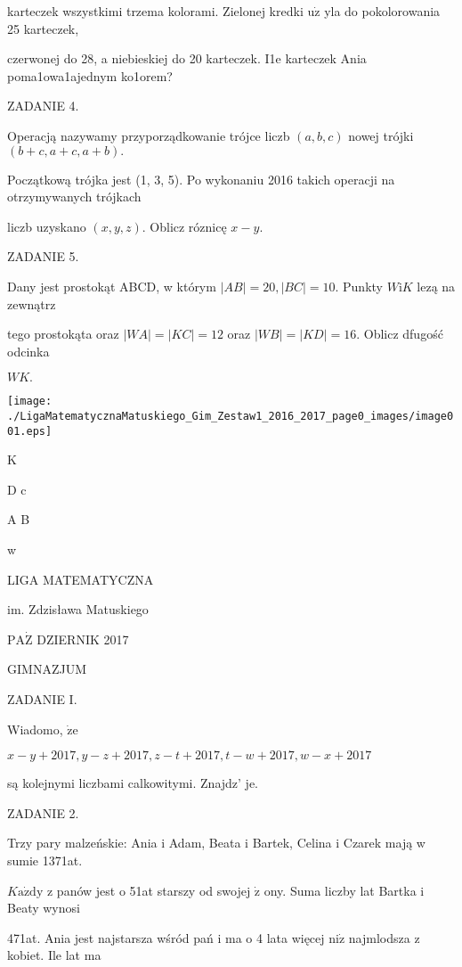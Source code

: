 \documentclass[a4paper,12pt]{article}
\begin{document}
karteczek wszystkimi trzema kolorami. Zielonej kredki $\mathrm{u}\dot{\mathrm{z}}$ yla do pokolorowania 25 karteczek,

czerwonej do 28, a niebieskiej do 20 karteczek. I1e karteczek Ania poma1owa1ajednym ko1orem?

ZADANIE 4.

Operacją nazywamy przyporządkowanie trójce liczb $(a,b,c)$ nowej trójki $(b+c,a+c,a+b).$

Początkową trójka jest (1, 3, 5). Po wykonaniu 2016 takich operacji na otrzymywanych trójkach

liczb uzyskano $(x,y,z)$. Oblicz róznicę $x-y.$

ZADANIE 5.

Dany jest prostokąt ABCD, w którym $|AB|=20, |BC|=10$. Punkty $W\mathrm{i}K$ lezą na zewnątrz

tego prostokąta oraz $|WA| = |KC| = 12$ oraz $|WB| = |KD| = 16$. Oblicz dfugość odcinka

$WK.$
\begin{center}
\texttt{[image: ./LigaMatematycznaMatuskiego\_Gim\_Zestaw1\_2016\_2017\_page0\_images/image001.eps]}
\end{center}
K

D c

A B

w






LIGA MATEMATYCZNA

im. Zdzisława Matuskiego

$\mathrm{P}\mathrm{A}\dot{\mathrm{Z}}$ DZIERNIK 2017

GIMNAZJUM

ZADANIE I.

Wiadomo, $\dot{\mathrm{z}}\mathrm{e}$

$x-y+2017,y-z+2017,z-t+2017,t-w+2017,w-x+2017$

są kolejnymi liczbami calkowitymi. Znajdz' je.

ZADANIE 2.

Trzy pary malzeńskie: Ania i Adam, Beata i Bartek, Celina i Czarek mają w sumie 1371at.

$K\mathrm{a}\dot{\mathrm{z}}\mathrm{d}\mathrm{y}$ z panów jest o 51at starszy od swojej $\dot{\mathrm{z}}$ ony. Suma liczby lat Bartka i Beaty wynosi

471at. Ania jest najstarsza wśród pań i ma o 4 lata więcej $\mathrm{n}\mathrm{i}\dot{\mathrm{z}}$ najmlodsza z kobiet. Ile lat ma
\end{document}
